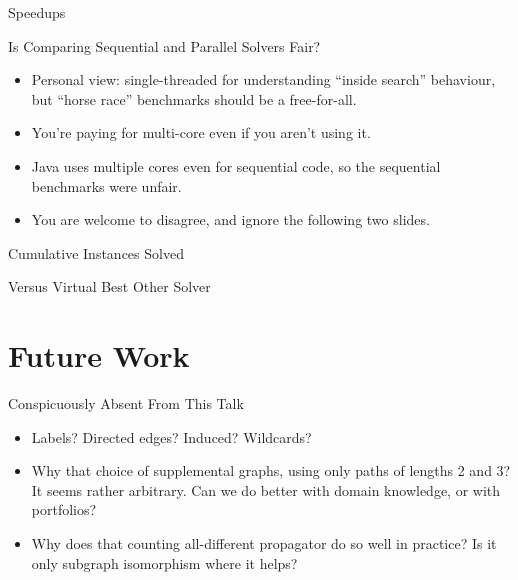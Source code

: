 \documentclass{beamer}
\begin{document}
\begin{frame}{Speedups}
    \only<1>{
        
    }
\end{frame}

\begin{frame}{Is Comparing Sequential and Parallel Solvers Fair?}
    \begin{itemize}
        \item Personal view: single-threaded for understanding ``inside search'' behaviour,
            but ``horse race'' benchmarks should be a free-for-all.

        \item You're paying for multi-core even if you aren't using it.

        \item Java uses multiple cores even for sequential code, so the sequential benchmarks were
            unfair.

        \item You are welcome to disagree, and ignore the following two slides.
    \end{itemize}
\end{frame}

\begin{frame}{Cumulative Instances Solved}
    \only<1>{
        
    }
    \only<2>{
        
    }
\end{frame}

\begin{frame}{Versus Virtual Best Other Solver}
    \only<1>{
        
    }
\end{frame}

\section{Future Work}
\frame{\sectionpage}

\begin{frame}{Conspicuously Absent From This Talk}
    \begin{itemize}
        \item Labels? Directed edges? Induced? Wildcards?

        \item Why that choice of supplemental graphs, using only paths of lengths 2 and 3? It seems
            rather arbitrary. Can we do better with domain knowledge, or with portfolios?

        \item Why does that counting all-different propagator do so well in practice? Is it only
            subgraph isomorphism where it helps?
    \end{itemize}
\end{frame}
\end{document}
